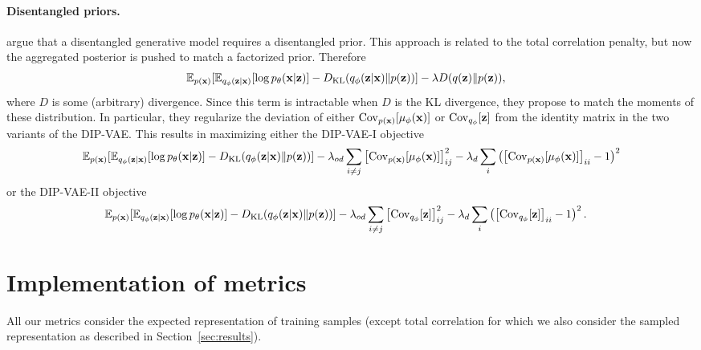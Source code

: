 \paragraph{Disentangled priors.}
\citet{kumar2017variational} argue that a disentangled generative model requires a disentangled prior. This approach is related to the total correlation penalty, but now the aggregated posterior is pushed to match a factorized prior. Therefore
\begin{align*}
&\mathbb{E}_{p({\mathbf{x}})} [ \mathbb{E}_{q_\phi({\mathbf{z}}|{\mathbf{x}})}[\log p_\theta({\mathbf{x}}|{\mathbf{z}})] - D_{\mathrm{KL}}(q_\phi({\mathbf{z}}|{\mathbf{x}}) \| p({\mathbf{z}}))] - \lambda D(q({\mathbf{z}})\|p({\mathbf{z}})),
\end{align*}
where $D$ is some (arbitrary) divergence. Since this term is intractable when $D$ is the KL divergence, they propose to match the moments of these distribution. In particular, they regularize the deviation of either $\mathrm{Cov}_{p({\mathbf{x}})}[\mu_\phi({\mathbf{x}})]$ or $\mathrm{Cov}_{q_\phi}[{\mathbf{z}}]$ from the identity matrix in the two variants of the DIP-VAE. This results in maximizing either the DIP-VAE-I objective
\begin{align*}
\mathbb{E}_{p({\mathbf{x}})} [ \mathbb{E}_{q_\phi({\mathbf{z}}|{\mathbf{x}})}[\log p_\theta({\mathbf{x}}|{\mathbf{z}})] - D_{\mathrm{KL}}(q_\phi({\mathbf{z}}|{\mathbf{x}}) \| p({\mathbf{z}}))] - \lambda_{od}\sum_{i\neq j} \left[\mathrm{Cov}_{p({\mathbf{x}})}[\mu_\phi({\mathbf{x}})]\right]_{ij}^2- \lambda_{d}\sum_{i} \left(\left[\mathrm{Cov}_{p({\mathbf{x}})}[\mu_\phi({\mathbf{x}})]\right]_{ii} - 1\right)^2
\end{align*}
or the DIP-VAE-II objective
\begin{align*}
&\mathbb{E}_{p({\mathbf{x}})} [ \mathbb{E}_{q_\phi({\mathbf{z}}|{\mathbf{x}})}[\log p_\theta({\mathbf{x}}|{\mathbf{z}})] - D_{\mathrm{KL}}(q_\phi({\mathbf{z}}|{\mathbf{x}}) \| p({\mathbf{z}}))] - \lambda_{od}\sum_{i\neq j} \left[\mathrm{Cov}_{q_\phi}[{\mathbf{z}}]\right]_{ij}^2- \lambda_{d}\sum_{i} \left(\left[\mathrm{Cov}_{q_\phi}[{\mathbf{z}}]\right]_{ii} - 1\right)^2.
\end{align*}

\clearpage
\section{Implementation of metrics}\label{app:metrics}
All our metrics consider the expected representation of training samples (except total correlation for which we also consider the sampled representation as described in Section~\ref{sec:results}).

